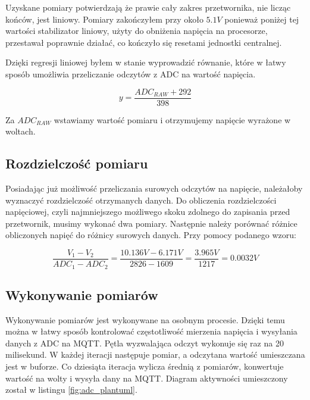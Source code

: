         
        Uzyskane pomiary potwierdzają że prawie cały zakres przetwornika, nie licząc końców, jest liniowy. Pomiary zakończyłem przy około $5.1V$ ponieważ poniżej tej wartości stabilizator liniowy, użyty do obniżenia napięcia na procesorze, przestawał poprawnie działać, co kończyło się resetami jednostki centralnej.
        
        Dzięki regresji liniowej byłem w stanie wyprowadzić równanie, które w łatwy sposób umożliwia przeliczanie odczytów z ADC na wartość napięcia.
        
        \vspace{1em}
        \begin{displaymath}
          y = \frac{ ADC_{RAW} + 292 }{ 398 }
        \end{displaymath}    
        \vspace{1em}
        
        Za $ADC_{RAW}$ wstawiamy wartość pomiaru i otrzymujemy napięcie wyrażone w woltach.
        
        
        
        
    \subsection{Rozdzielczość pomiaru}
        Posiadając już możliwość przeliczania surowych odczytów na napięcie, należałoby wyznaczyć rozdzielczość otrzymanych danych. Do obliczenia rozdzielczości napięciowej, czyli najmniejszego możliwego skoku zdolnego do zapisania przed przetwornik, musimy wykonać dwa pomiary. Następnie należy porównać różnice obliczonych napięć do różnicy surowych danych. Przy pomocy podanego wzoru:
        
        \vspace{1em}
        \begin{displaymath}
          \frac{ V_{1} - V_{2} }{ ADC_{1} - ADC_{2} } = \frac{ 10.136V - 6.171V  }{ 2826 - 1609 } = \frac{ 3.965V }{ 1217 } = 0.0032V
        \end{displaymath}    
        \vspace{1em}
          
          
    \subsection{Wykonywanie pomiarów}
        Wykonywanie pomiarów jest wykonywane na osobnym procesie. Dzięki temu można w łatwy sposób kontrolować częstotliwość mierzenia napięcia i wysyłania danych z ADC na MQTT. Pętla wyzwalająca odczyt wykonuje się raz na 20 milisekund. W każdej iteracji następuje pomiar, a odczytana wartość umieszczana jest w buforze. Co dziesiąta iteracja wylicza średnią z pomiarów, konwertuje wartość na wolty i wysyła dany na MQTT. Diagram aktywności umieszczony został w listingu \ref{fig:adc_plantuml}. 
        
